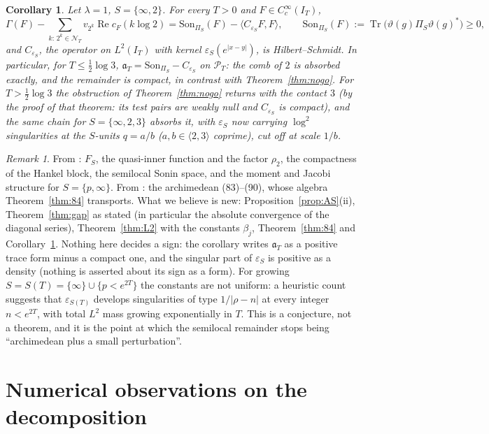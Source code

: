 \documentclass[11pt]{amsart}
\newtheorem{corollary}[theorem]{Corollary}
\theoremstyle{definition}
\theoremstyle{remark}
\newtheorem{remark}[theorem]{Remark}
\newcommand{\Rel}{\operatorname{Re}}
\newcommand{\Tr}{\operatorname{Tr}}
\newcommand{\IT}{I_T}
\newcommand{\PT}{\mathcal P_T}
\newcommand{\cF}{c_F}
\newcommand{\NT}{\mathcal N_T}
\newcommand{\Son}{\mathrm{Son}}
\begin{document}
\begin{corollary}\label{cor:split}
Let $\lambda=1$, $S=\{\infty,2\}$. For every $T>0$ and $F\in C_c^\infty(\IT)$,
\[
\Gamma(F)-\sum_{k:\,2^k\in\NT}v_{2^k}\Rel\cF(k\log2)=\Son_{\Pi_S}(F)-\langle C_{\varepsilon_S}F,F\rangle,\qquad
\Son_{\Pi_S}(F):=\Tr\big(\vartheta(g)\Pi_S\vartheta(g)^*\big)\ge0,
\]
and $C_{\varepsilon_S}$, the operator on $L^2(\IT)$ with kernel $\varepsilon_S(e^{|x-y|})$, is Hilbert--Schmidt. In particular, for
$T\le\frac12\log3$, $\mathfrak a_T=\Son_{\Pi_S}-C_{\varepsilon_S}$ on $\PT$: the comb of $2$ is absorbed exactly, and the remainder
is compact, in contrast with Theorem~\ref{thm:nogo}. For $T>\frac12\log3$ the obstruction of Theorem~\ref{thm:nogo} returns
with the contact $3$ (by the proof of that theorem: its test pairs are weakly null and $C_{\varepsilon_S}$ is compact), and the same chain for $S=\{\infty,2,3\}$ absorbs it, with $\varepsilon_S$ now carrying $\log^2$
singularities at the $S$-units $q=a/b$ ($a,b\in\langle2,3\rangle$ coprime), cut off at scale $1/b$.
\end{corollary}

\begin{remark}
From \cite{CCquasi,CCM2023,CCM2024}: $F_S$, the quasi-inner function and the factor $\rho_2$, the compactness of the Hankel
block, the semilocal Sonin space, and the moment and Jacobi structure for $S=\{p,\infty\}$. From \cite{CC2021}: the
archimedean (83)--(90), whose algebra Theorem~\ref{thm:84} transports. What we believe is new: Proposition~\ref{prop:AS}(ii),
Theorem~\ref{thm:gap} as stated (in particular the absolute convergence of the diagonal series), Theorem~\ref{thm:L2} with the
constants $\beta_j$, Theorem~\ref{thm:84} and Corollary~\ref{cor:split}. Nothing here decides a sign: the corollary writes
$\mathfrak a_T$ as a positive trace form minus a compact one, and the singular part of $\varepsilon_S$ is positive as a density (nothing is
asserted about its sign as a form). For growing $S=S(T)=\{\infty\}\cup\{p<e^{2T}\}$ the constants are not uniform: a
heuristic count suggests that $\varepsilon_{S(T)}$ develops singularities of type $1/|\rho-n|$ at every integer $n<e^{2T}$, with
total $L^2$ mass growing exponentially in $T$. This is a conjecture, not a theorem, and it is the point at which the
semilocal remainder stops being ``archimedean plus a small perturbation''.
\end{remark}

\section{Numerical observations on the decomposition}\label{sec:num}
\end{document}
